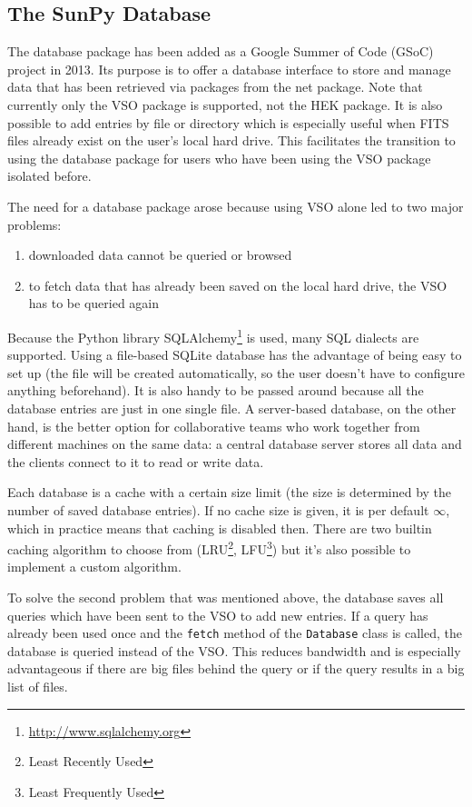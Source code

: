 \subsection{The SunPy Database}
The database package has been added as a Google Summer of Code (GSoC) project
in 2013. Its purpose is to offer a database interface to store and manage data
that has been retrieved via packages from the net package. Note that currently
only the \textsc{VSO} package is supported, not the HEK package. It is also
possible to add entries by file or directory which is especially useful when
\textsc{FITS} files already exist on the user's local hard drive. This
facilitates the transition to using the database package for users who have
been using the \textsc{VSO} package isolated before.

The need for a database package arose because using \textsc{VSO} alone led to
two major problems:

\begin{enumerate}
  \item downloaded data cannot be queried or browsed
  \item to fetch data that has already been saved on the local hard drive,
    the VSO has to be queried again
\end{enumerate}

Because the Python library SQLAlchemy\footnote{\url{http://www.sqlalchemy.org}}
is used, many SQL dialects are supported. Using a file-based SQLite database
has the advantage of being easy to set up (the file will be created
automatically, so the user doesn't have to configure anything beforehand).
It is also handy to be passed around because all the database entries are just
in one single file. A server-based database, on the other hand, is the better
option for collaborative teams who work together from different machines on the
same data: a central database server stores all data and the clients connect to
it to read or write data.

Each database is a cache with a certain size limit (the size is determined by
the number of saved database entries). If no cache size is given, it is per
default $\infty$, which in practice means that caching is disabled then. There
are two builtin caching algorithm to choose from (LRU\footnote{Least Recently
Used}, LFU\footnote{Least Frequently Used}) but it's also possible to implement
a custom algorithm.

To solve the second problem that was mentioned above, the database saves all
queries which have been sent to the \textsc{VSO} to add new entries. If a query
has already been used once and the \texttt{fetch} method of the \texttt{Database}
class is called, the database is queried instead of the \textsc{VSO}. This
reduces bandwidth and is especially advantageous if there are big files behind
the query or if the query results in a big list of files.

